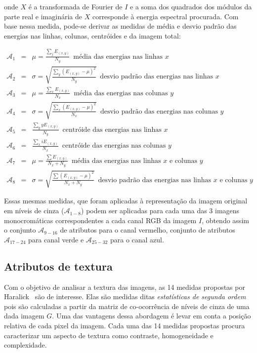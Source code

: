 \noindent onde $X$ é a transformada de Fourier de $I$ e a soma dos quadrados dos
módulos da parte real e imaginária de $X$ corresponde à energia espectral
procurada. Com base nessa medida, pode-se derivar as medidas de média e desvio
padrão das energias nas linhas, colunas, centróides e da imagem total:

\begin{eqnarray}
  \mathcal{A}_1 &=& \mu = \frac{\sum_j E_{(x,y)}}{N_y} \, \, \, \text{média das energias
    nas linhas $x$} \\
  \mathcal{A}_2 &=& \sigma = \sqrt{\frac{\sum_y (E_{(x,y)} - \mu)^2}{N_y}} \, \, \,
  \text{desvio padrão das energias nas linhas $x$} \\
  \mathcal{A}_3 &=& \mu = \frac{\sum_x E_{(x,y)}}{N_x} \, \, \, \text{média das energias
    nas colunas $y$} \\
  \mathcal{A}_4 &=& \sigma = \sqrt{\frac{\sum_x (E_{(x,y)} - \mu)^2}{N_x}} \, \, \,
  \text{desvio padrão das energias nas colunas $y$} \\
  \mathcal{A}_5 &=& \frac{\sum_y y E_{(x,y)}}{N_y} \, \, \, \text{centróide das energias
    nas linhas $x$} \\
  \mathcal{A}_6 &=& \frac{\sum_x i E_{(x,y)}}{N_x} \, \, \, \text{centróide das energias
    nas colunas $y$} \\
  \mathcal{A}_7 &=& \mu = \frac{\sum E_{(x,y)}}{N_x + N_y} \, \, \, \text{média das energias
    nas linhas $x$ e colunas $y$} \\
  \mathcal{A}_8 &=& \sigma = \sqrt{\frac{\sum (E_{(x,y)} - \mu)^2}{N_x + N_y}} \, \, \,
  \text{desvio padrão das energias nas linhas $x$ e colunas $y$}
\end{eqnarray}

Essas mesmas medidas, que foram aplicadas à representação da imagem
original em níveis de cinza ($\mathcal{A}_{1-8}$) podem ser aplicadas
para cada uma das 3 imagens monocromáticas correspondentes a cada
canal RGB da imagem $I$, obtendo assim o conjunto $\mathcal{A}_{9-16}$
de atributos para o canal vermelho, conjunto de atributos
$\mathcal{A}_{17-24}$ para canal verde e $\mathcal{A}_{25-32}$ para o
canal azul.

\subsection{Atributos de textura}

Com o objetivo de analisar a textura das imagens, as 14 medidas
propostas por Haralick~\cite{haralick} são de interesse. Elas são
medidas ditas \emph{estatísticas de segunda ordem} pois são calculadas
a partir da matriz de co-ocorrência de níveis de cinza de uma dada
imagem $G$. Uma das vantagens dessa abordagem é levar em conta a
posição relativa de cada pixel da imagem. Cada uma das 14 medidas
propostas procura caracterizar um aspecto de textura como contraste,
homogeneidade e complexidade.

